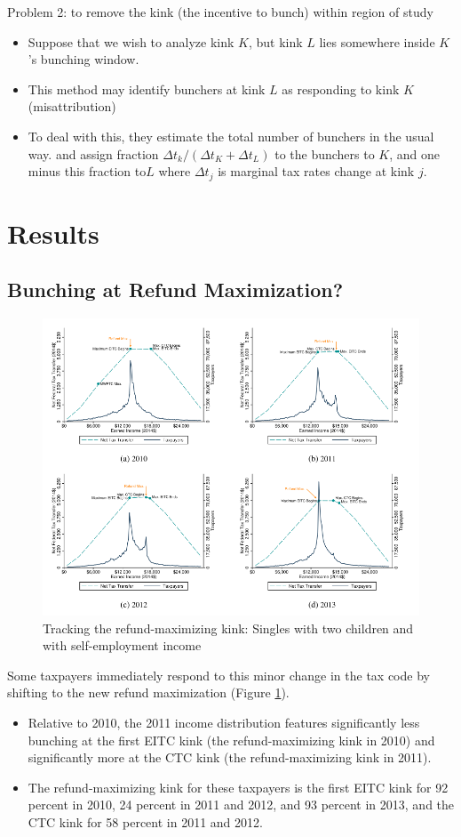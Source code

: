 \documentclass[../root]{subfiles}
\begin{document}
    Problem 2: to remove the kink (the incentive to bunch) within region of study 
    \begin{itemize}
        \item Suppose that we wish to analyze kink $K$, but kink $L$ lies somewhere inside $K$'s bunching window.
        \item This method may identify bunchers at kink $L$ as responding to kink $K$ (misattribution)
        \item To deal with this, they estimate the total number of bunchers in the usual way. and assign fraction $\Delta t_k/(\Delta t_K + \Delta t_L)$ to the bunchers to $K$, and one minus this fraction to$L$ where $\Delta t_j$ is marginal tax rates change at kink $j$.  
    \end{itemize}


    \section{Results}

    \subsection{Bunching at Refund Maximization?}

    \begin{figure}[t]
        \centering
        \includegraphics[width = 0.8\linewidth]{0626kato/fig6.PNG}
        \caption{Tracking the refund-maximizing kink: Singles with two children and with self-employment income}
        \label{fig6}
    \end{figure}

    Some taxpayers immediately respond to this minor change in the tax code by shifting to the new refund maximization (Figure \ref{fig6}).
    \begin{itemize}
        \item Relative to 2010, the 2011 income distribution features significantly less bunching at the first EITC kink (the refund-maximizing kink in 2010) and significantly more at the CTC kink (the refund-maximizing kink in 2011).
        \item The refund-maximizing kink for these taxpayers is the first EITC kink for 92 percent in 2010, 24 percent in 2011 and 2012, and 93 percent in 2013, and the CTC kink for 58 percent in 2011 and 2012.
    \end{itemize} 
\end{document}
